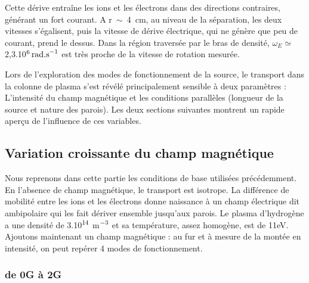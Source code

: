 \begin{refsection}
Cette dérive entraîne les ions et les électrons dans des directions
contraires, générant un fort courant. A r~$\sim$~4~cm, au niveau de la
séparation, les deux vitesses s'égalisent, puis la vitesse de dérive électrique, qui ne
génère que peu de courant, prend le dessus. Dans la région traversée par le bras
de densité, $\omega_E\simeq$ 2,3.10$^{{6}}\,\text{rad.s}^{{-1}}$
est très proche de la vitesse de rotation mesurée.

Lors de l'exploration des modes de fonctionnement de la source, le transport
dans la colonne de plasma s'est révélé principalement sensible à deux
paramètres : L'intensité du champ magnétique et les conditions parallèles 
(longueur de la source et nature des parois). Les deux sections suivantes
montrent un rapide aperçu de l'influence de ces variables.

\subsection{Variation croissante du champ magnétique}
Nous reprenons dans cette partie les conditions de base utilisées précédemment.
En l'absence de champ magnétique, le transport est isotrope. La différence de
mobilité entre les ions et les électrons donne naissance à un champ électrique
dit ambipolaire qui les fait dériver ensemble jusqu'aux parois. Le plasma
d'hydrogène a une densité de 3.10$^{{14}}$ m$^{{-3}}$ et sa
température, assez homogène, est de 11eV. Ajoutons maintenant un champ
magnétique : au fur et à mesure de la montée en intensité, on peut repérer 4
modes de fonctionnement.

\subsubsection{de 0G à 2G}


\end{refsection}
